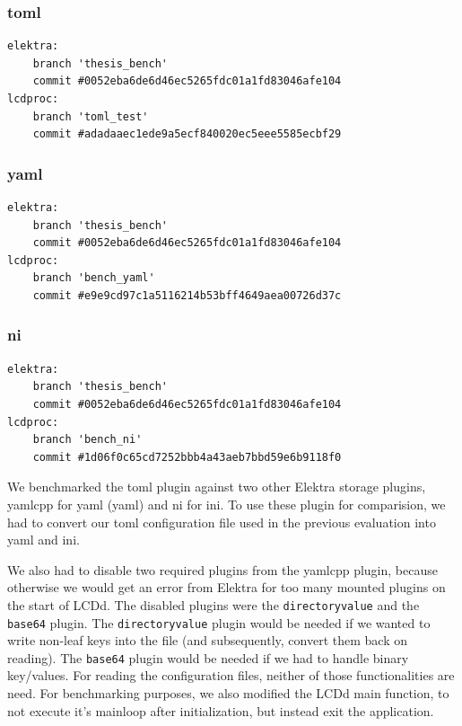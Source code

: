 \documentclass[draft,final]{vutinfth} %
\begin{document}
\subsubsection{\acrshort{toml}}
\begin{Verbatim}[frame=single, fontsize=\small]
elektra:
    branch 'thesis_bench'
    commit #0052eba6de6d46ec5265fdc01a1fd83046afe104
lcdproc:
    branch 'toml_test'
    commit #adadaaec1ede9a5ecf840020ec5eee5585ecbf29
\end{Verbatim}
\subsubsection{\acrshort{yaml}}
\begin{Verbatim}[frame=single, fontsize=\small]
elektra:
    branch 'thesis_bench'
    commit #0052eba6de6d46ec5265fdc01a1fd83046afe104
lcdproc:
    branch 'bench_yaml'
    commit #e9e9cd97c1a5116214b53bff4649aea00726d37c
\end{Verbatim}

\subsubsection{ni}
\begin{Verbatim}[frame=single, fontsize=\small]
elektra:
    branch 'thesis_bench'
    commit #0052eba6de6d46ec5265fdc01a1fd83046afe104
lcdproc:
    branch 'bench_ni'
    commit #1d06f0c65cd7252bbb4a43aeb7bbd59e6b9118f0
\end{Verbatim}

We benchmarked the \acrshort{toml} plugin against two other Elektra storage plugins, yamlcpp for \acrshort{yaml} (\acrlong{yaml}) and ni for \acrshort{ini}.
To use these plugin for comparision, we had to convert our \acrshort{toml} configuration file used in the previous evaluation into \acrshort{yaml} and \acrshort{ini}.

We also had to disable two required plugins from the yamlcpp plugin, because otherwise we would get an error from Elektra for too many mounted plugins on the start of LCDd.
The disabled plugins were the \texttt{directoryvalue} and the \texttt{base64} plugin.
The \texttt{directoryvalue} plugin would be needed if we wanted to write non-leaf keys into the file (and subsequently, convert them back on reading).
The \texttt{base64} plugin would be needed if we had to handle binary key/values.
For reading the configuration files, neither of those functionalities are need.
For benchmarking purposes, we also modified the LCDd main function, to not execute it's mainloop after initialization, but instead exit the application.
\end{document}
